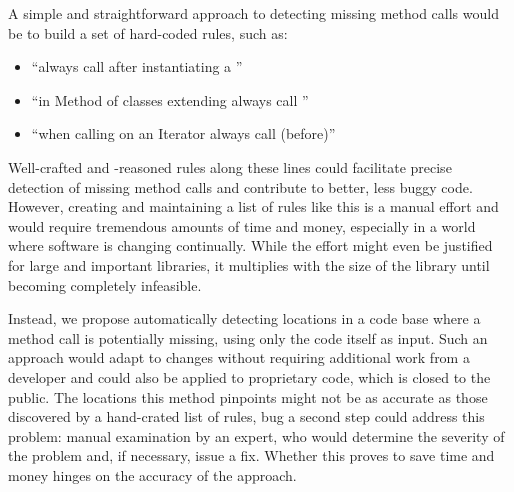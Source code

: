 A simple and straightforward approach to detecting missing method calls would be to build a set of hard-coded rules, such as:
\begin{itemize}
    \item ``always call  after instantiating a ''
    \item ``in Method  of classes extending  always call ''
    \item ``when calling  on an Iterator always call  (before)''
\end{itemize}
Well-crafted and -reasoned rules along these lines could facilitate precise detection of missing method calls and contribute to better, less buggy code.
However, creating and maintaining a list of rules like this is a manual effort and would require tremendous amounts of time and money, especially in a world where software is changing continually.
While the effort might even be justified for large and important libraries, it multiplies with the size of the library until becoming completely infeasible.

Instead, we propose automatically detecting locations in a code base where a method call is potentially missing, using only the code itself as input.
Such an approach would adapt to changes without requiring additional work from a developer and could also be applied to proprietary code, which is closed to the public.
The locations this method pinpoints might not be as accurate as those discovered by a hand-crated list of rules, bug a second step could address this problem: manual examination by an expert, who would determine the severity of the problem and, if necessary, issue a fix.
Whether this proves to save time and money hinges on the accuracy of the approach.



